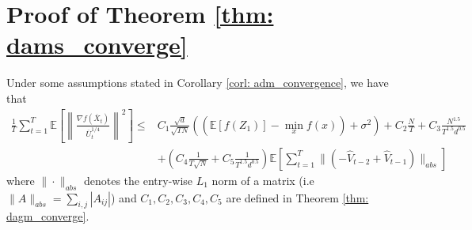 \documentclass[anon,12pt]{colt2021} %
\begin{document}
\clearpage


\section{Proof of Theorem \ref{thm: dams_converge}} \label{app: proof_ams}

Under some assumptions stated in Corollary \ref{corl: adm_convergence}, we have that
\begin{align}\label{eq: rep_thm1}
	 \frac{1}{T}\sum_{t=1}^T  \mathbb E \left [\left\|\frac{\nabla f( \overline X_{t})}{\overline U_{t}^{1/4}}\right\|^2  \right] 
	\leq  & C_1 \frac{\sqrt{d}}{\sqrt{TN}} \left(( \mathbb E  [f( Z_{1})]  -  \min_x  f(x)) +    \sigma^2 \right)  +  C_2 \frac{N}{T}  +  C_3 \frac{N^{1.5}}{T^{1.5}d^{0.5}} 
	\nonumber \\
    &+  \left(C_4 \frac{1}{T\sqrt{N}} +  C_5   \frac{1}{T^{1.5}d^{0.5}}\right)\mathbb E \left[ \sum_{t=1}^{T}   \|    (- \hat V_{t-2} + \hat V_{t-1} ) \|_{abs} \right] 
\end{align}
where $\| \cdot\|_{abs}$  denotes the entry-wise $L_1$ norm of a matrix (i.e $\| A\|_{abs} = \sum_{i,j}{|A_{ij}|}$) and $C_1, C_2 ,C_3, C_4, C_5$ are defined in Theorem \ref{thm: dagm_converge}. 
\end{document}
